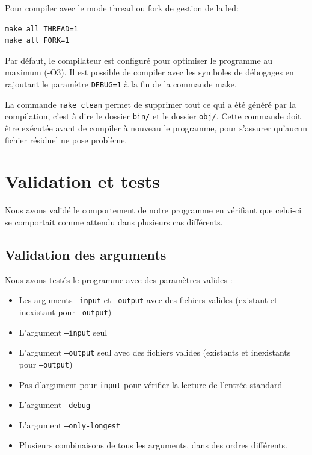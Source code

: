 \documentclass[a4paper,11pt]{article}
\begin{document}
Pour compiler avec le mode thread ou fork de gestion de la led:

\begin{verbatim}
make all THREAD=1
make all FORK=1
\end{verbatim}

Par défaut, le compilateur est configuré pour optimiser le programme au maximum (-O3). Il est possible de compiler avec les symboles de débogages en rajoutant le paramètre \texttt{DEBUG=1} à la fin de la commande make.

La commande \texttt{make clean} permet de supprimer tout ce qui a été généré par la compilation, c'est à dire le dossier \texttt{bin/} et le dossier \texttt{obj/}. Cette commande doit être exécutée avant de compiler à nouveau le programme, pour s'assurer qu'aucun fichier résiduel ne pose problème.

\section{Validation et tests}

Nous avons validé le comportement de notre programme en vérifiant que celui-ci se comportait comme attendu dans plusieurs cas différents.

\subsection{Validation des arguments}

Nous avons testés le programme avec des paramètres valides :
\begin{itemize}
    \item Les arguments \texttt{--input} et \texttt{--output} avec des fichiers valides (existant et inexistant pour \texttt{--output})
    \item L'argument \texttt{--input} seul
    \item L'argument \texttt{--output} seul avec des fichiers valides (existants et inexistants pour \texttt{--output})
    \item Pas d'argument pour \texttt{input} pour vérifier la lecture de l'entrée standard
    \item L'argument \texttt{--debug}
    \item L'argument \texttt{--only-longest}
    \item Plusieurs combinaisons de tous les arguments, dans des ordres différents.
\end{itemize}
\end{document}
